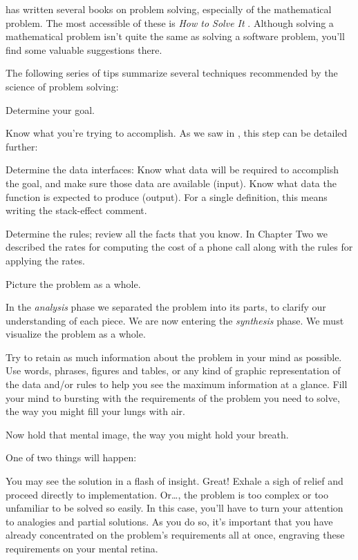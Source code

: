  has written several books on problem solving, especially of
the mathematical problem. The most accessible of these is
\emph{How to Solve It} \cite{polya}.%
%
Although solving a mathematical problem isn't quite the same as
solving a software problem, you'll find some valuable suggestions there.

The following series of tips summarize several techniques recommended by
the science of problem solving:

\begin{tip}
Determine your goal.
\end{tip}
Know what you're trying to accomplish. As we saw in , this
step can be detailed further:

Determine the data interfaces: Know what data will be required to
accomplish the goal, and make sure those data are available (input).
Know what data the function is expected to produce (output). For a single
definition, this means writing the stack-effect comment.

Determine the rules;
review all the facts that you know. In Chapter Two we described the
rates for computing the cost of a phone call along with the rules for
applying the rates.

\begin{tip}
Picture the problem as a whole.
\end{tip}
In the \emph{analysis} phase we separated the problem into its parts, to
clarify our understanding of each piece. We are now entering the
\emph{synthesis} phase. We must visualize the problem as a whole.

Try to retain as much information about the problem in your mind
as possible. Use words, phrases, figures and tables, or any kind of graphic
representation of the data and/or rules to help you see the maximum
information at a glance. Fill your mind to bursting with the requirements
of the problem you need to solve, the way you might fill your lungs with
air.

Now hold that mental image, the way you might hold your breath.

One of two things will happen:

You may see the solution in a flash of insight. Great! Exhale a sigh
of relief and proceed directly to implementation. Or\dots{}, the problem is
too complex or too unfamiliar to be solved so easily. In this case, you'll
have to turn your attention to analogies and partial solutions. As you do
so, it's important that you have already concentrated on the problem's
requirements all at once, engraving these requirements on your mental
retina.

